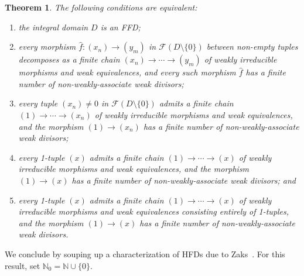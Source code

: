 \documentclass[reqno]{amsart}
\theoremstyle{plain}
\newtheorem{thm}[lem]{Theorem}
\theoremstyle{definition}
\newcommand{\cat}[1]{\mathcal{#1}}
\newcommand{\catf}{\cat{F}}
\newcommand{\bbn}{\mathbb{N}}
\newcommand{\emptytuple}{\mathfrak{0}}
\numberwithin{equation}{lem}
\begin{document}
\begin{thm}\label{prop170710y}
The following conditions are equivalent:
\begin{enumerate}[\rm(i)]
\item\label{prop170710y1}
the integral domain $D$ is an FFD;
\item\label{prop170710y2}
every morphism $\hat f\colon (x_n)\to(y_m)$ in $\catf(D \setminus \{0\})$ between non-empty tuples decomposes as a finite chain
$(x_n)\to\cdots\to(y_m)$ of 
weakly
irreducible morphisms and weak equivalences,
and every such 
morphism
$\hat f$ has a finite number of non-weakly-associate weak divisors;
\item\label{prop170710y3}
every tuple $(x_n)\neq\emptytuple$ in $\catf(D \setminus \{0\})$ admits a finite chain
$(1)\to\cdots\to(x_n)$ of 
weakly
irreducible morphisms and weak equivalences, and 
the morphism
$(1)\to(x_n)$ has a finite number of non-weakly-associate weak divisors;
\item\label{prop170710y4}
every 1-tuple $(x)$ admits a finite chain
$(1)\to\cdots\to(x)$ of 
weakly
irreducible morphisms and weak equivalences, and 
the morphism
$(1)\to(x)$ has a finite number of non-weakly-associate weak divisors;
and
\item\label{prop170710y4'}
every 1-tuple $(x)$ admits a finite chain
$(1)\to\cdots\to(x)$ of 
weakly
irreducible morphisms and weak equivalences consisting entirely of 1-tuples, and 
the morphism
$(1)\to(x)$ has a finite number of non-weakly-associate weak divisors.
\end{enumerate}
\end{thm}


We conclude by souping up a characterization of HFDs due to Zaks~\cite{zaks}.
For this result, set $\bbn_0=\bbn\cup\{0\}$.
\end{document}
